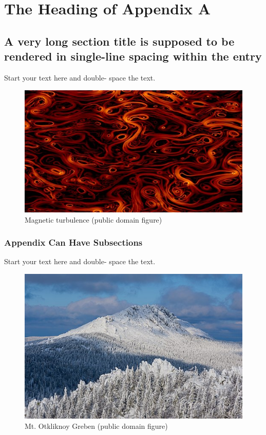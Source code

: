 \documentclass[debug, font=Times]{gw-dissertation}[2021/11/19]
\begin{document}
\sloppy
\printbibliography
\fussy

\appendix
\chapter{The Heading of Appendix A}

    \section{
        A very long section title is supposed to be rendered in single-line spacing within the entry
    }
    Start your text here and double- space the text.
    \begin{figure}[h!]
        \Centering
        \includegraphics[width=0.5\linewidth]{magnetic_turbulence.jpg}
        \caption{Magnetic turbulence (public domain figure)}
    \end{figure}

        \subsection{Appendix Can Have Subsections}
        Start your text here and double- space the text.
        \begin{figure}[h!]
            \Centering
            \includegraphics[width=0.5\linewidth]{mt_otkliknoy_greben.jpg}
            \caption{Mt. Otkliknoy Greben (public domain figure)}
        \end{figure}

\end{document}
